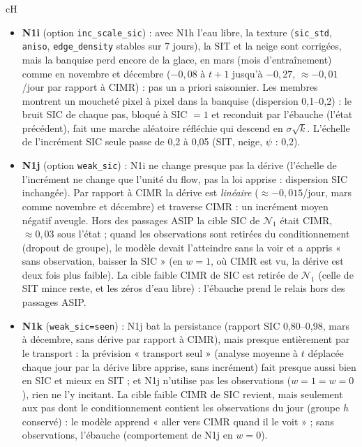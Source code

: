 \documentclass[10pt]{article}
\begin{document}
\begin{bsec}{cH}
\begin{itemize}
\item \textbf{N1i} (option \texttt{inc\_scale\_sic}) : avec N1h l'eau libre, la texture (\texttt{sic\_std}, \texttt{aniso}, \texttt{edge\_density} stables sur 7 jours), la SIT et la neige sont corrigées, mais la banquise perd encore de la glace, en mars (mois d'entraînement) comme en novembre et décembre ($-0{,}08$ à $t+1$ jusqu'à $-0{,}27$, $\approx -0{,}01$/jour par rapport à CIMR) : pas un a priori saisonnier. Les membres montrent un moucheté pixel à pixel dans la banquise (dispersion 0,1--0,2) : le bruit SIC de chaque pas, bloqué à SIC $=1$ et reconduit par l'ébauche (l'état précédent), fait une marche aléatoire réfléchie qui descend en $\sigma\sqrt k$. L'échelle de l'incrément SIC seule passe de 0,2 à 0,05 (SIT, neige, $\psi$ : 0,2).
\item \textbf{N1j} (option \texttt{weak\_sic}) : N1i ne change presque pas la dérive (l'échelle de l'incrément ne change que l'unité du flow, pas la loi apprise : dispersion SIC inchangée). Par rapport à CIMR la dérive est \emph{linéaire} ($\approx -0{,}015$/jour, mars comme novembre et décembre) et traverse CIMR : un incrément moyen négatif aveugle. Hors des passages ASIP la cible SIC de $\mathcal N_1$ était CIMR, $\approx 0{,}03$ sous l'état ; quand les observations sont retirées du conditionnement (dropout de groupe), le modèle devait l'atteindre sans la voir et a appris « sans observation, baisser la SIC » (en $w=1$, où CIMR est vu, la dérive est deux fois plus faible). La cible faible CIMR de SIC est retirée de $\mathcal N_1$ (celle de SIT mince reste, et les zéros d'eau libre) : l'ébauche prend le relais hors des passages ASIP.
\item \textbf{N1k} (\texttt{weak\_sic=seen}) : N1j bat la persistance (rapport SIC 0,80--0,98, mars à décembre, sans dérive par rapport à CIMR), mais presque entièrement par le transport : la prévision « transport seul » (analyse moyenne à $t$ déplacée chaque jour par la dérive libre apprise, sans incrément) fait presque aussi bien en SIC et mieux en SIT ; et N1j n'utilise pas les observations ($w=1=w=0$), rien ne l'y incitant. La cible faible CIMR de SIC revient, mais seulement aux pas dont le conditionnement contient les observations du jour (groupe $h$ conservé) : le modèle apprend « aller vers CIMR quand il le voit » ; sans observations, l'ébauche (comportement de N1j en $w=0$).

\end{itemize}
\end{bsec}
\end{document}
